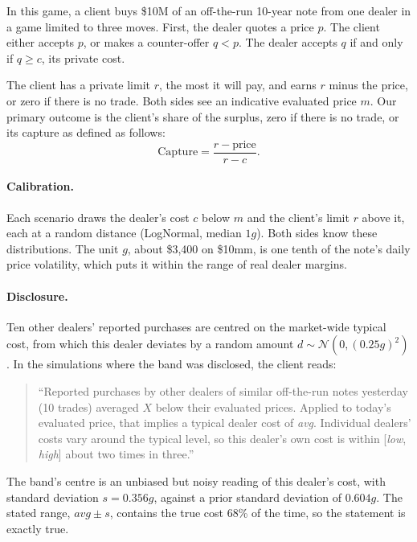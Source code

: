 \documentclass[sigconf]{acmart}
\begin{document}
In this game, a client buys \$10M of an off-the-run 10-year note from one dealer in a game limited to three moves. First, the dealer quotes a price $p$. The client either accepts $p$, or makes a counter-offer $q < p$. The dealer accepts $q$ if and only if $q \ge c$, its private cost.

The client has a private limit $r$, the most it will pay, and earns $r$ minus the price, or zero if there is no trade. Both sides see an indicative evaluated price $m$. Our primary outcome is the client's share of the surplus, zero if there is no trade, or its capture as defined as follows:
\begin{equation}
  \text{Capture} = \frac{r - \text{price}}{r - c}.
\end{equation}

\paragraph{Calibration.}
Each scenario draws the dealer's cost $c$ below $m$ and the client's limit $r$ above it, each at a random distance (LogNormal, median $1g$). Both sides know these distributions. The unit $g$, about \$3{,}400 on \$10mm, is one tenth of the note's daily price volatility, which puts it within the range of real dealer margins.

\paragraph{Disclosure.}
Ten other dealers' reported purchases are centred on the market-wide typical cost, from which this dealer deviates by a random amount $d \sim \mathcal{N}\!\left(0, (0.25g)^2\right)$. In the simulations where the band was disclosed, the client reads:

\begin{quote}
``Reported purchases by other dealers of similar off-the-run notes yesterday (10 trades) averaged $X$ below their evaluated prices. Applied to today's evaluated price, that implies a typical dealer cost of \textit{avg}. Individual dealers' costs vary around the typical level, so this dealer's own cost is within [\textit{low}, \textit{high}] about two times in three.''
\end{quote}

The band's centre is an unbiased but noisy reading of this dealer's cost, with standard deviation $s = 0.356g$, against a prior standard deviation of $0.604g$. The stated range, $\textit{avg} \pm s$, contains the true cost 68\% of the time, so the statement is exactly true.
\end{document}
